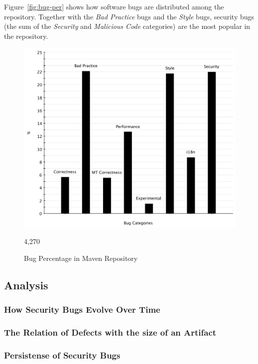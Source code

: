 \documentclass[conference]{IEEEtran}
\begin{document}
Figure~\ref{fig:bug-per} shows how software bugs are distributed among the
repository. Together with the {\it Bad Practice} bugs and the {\it Style} bugs,
security bugs (the sum of the {\it Security} and {\it Malicious Code}
categories) are the most popular in the repository.

\begin{figure}
	\centering
	\includegraphics[scale=0.6]{bug_percent}
	\caption{Bug Percentage in Maven Repository}
	\label{fig:bug-percentage}4,270 
\end{figure}

\subsection{Analysis}
\label{sec:analysis}

\subsubsection{How Security Bugs Evolve Over Time}

\subsubsection{The Relation of Defects with the size of an Artifact}

\subsubsection{Persistense of Security Bugs}
\end{document}
